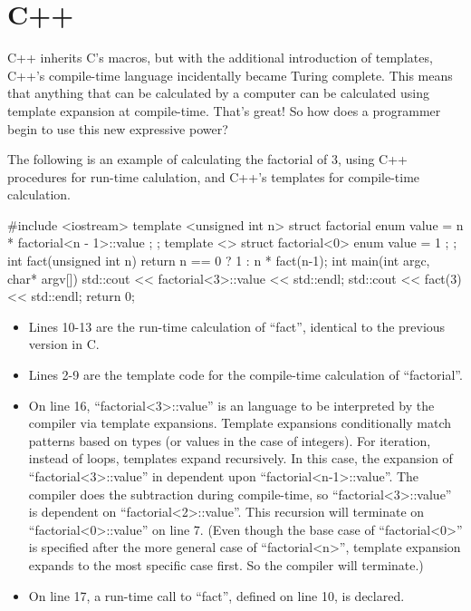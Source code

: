  \section{C++}

 C++ inherits C's macros, but with the additional introduction
 of templates, C++'s compile-time language
 incidentally became Turing complete.  This means that
 anything that can be
 calculated by a computer can be calculated using template expansion
 at compile-time.  That's great!  So how does a programmer begin to use this new
 expressive power?

 The following is an example of calculating the factorial of
 3, using C++ procedures for run-time calulation, and C++'s templates for compile-time
 calculation.

 \begin{code}
 #include <iostream>
 template <unsigned int n>
 struct factorial {
     enum { value = n * factorial<n - 1>::value };
 };
 template <>
 struct factorial<0> {
     enum { value = 1 };
 };
 int fact(unsigned int n){
   return n == 0
     ? 1
     : n * fact(n-1);
 }
 int main(int argc, char* argv[]){
   std::cout << factorial<3>::value << std::endl;
   std::cout << fact(3) << std::endl;
   return 0;
 }
 \end{code}

 \begin{itemize}
  \item
    Lines 10-13 are the run-time calculation of ``fact'', identical
    to the previous version in C.
  \item
   Lines 2-9 are the
   template code for the compile-time calculation of ``factorial''.
   \item
 On line 16, ``factorial\textless3\textgreater::value'' is an
 language to be interpreted
 by the compiler via template expansions.  Template expansions
 conditionally match patterns based on types (or values in the case
 of integers).  For iteration, instead of loops, templates expand recursively.
 In this case, the expansion of
 ``factorial\textless3\textgreater::value'' in dependent upon
 ``factorial\textless n-1\textgreater::value''.  The compiler
 does the subtraction during compile-time,
 so ``factorial\textless3\textgreater::value'' is dependent on
 ``factorial\textless2\textgreater::value''.
 This recursion will terminate on ``factorial\textless0\textgreater::value''
 on line 7. (Even though
 the base case of ``factorial\textless0\textgreater'' is specified
 after the more general
 case of ``factorial\textless n\textgreater'', template expansion expands to the most
 specific case first.  So the compiler will terminate.)

   \item
 On line 17, a run-time call to ``fact'', defined on line 10, is declared.
 \end{itemize}

